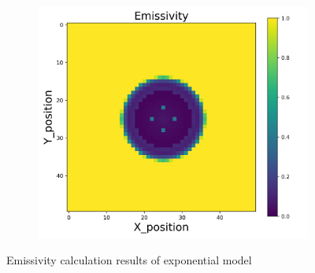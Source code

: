 {\begin{figure}[p]
\begin{minipage}{\textwidth}
\begin{subfigure}{0.325\textwidth}
        \end{subfigure}
        \begin{subfigure}{0.325\textwidth}
            \centering
            \includegraphics[width=\textwidth]{figures/raw_data/33/exp/emi_cal.jpg}
        \end{subfigure}
    \end{minipage}
    \caption{Emissivity calculation results of exponential model}  
\end{figure}


\newpage
}
